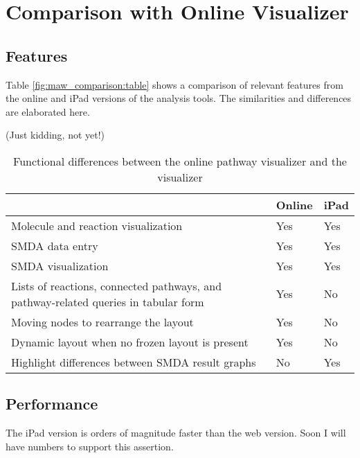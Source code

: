 \section{Comparison with Online \pathcasemaw Visualizer}
\label{sect:maw_comparison}

\subsection{Features}
\label{sect:maw_comparison_features}

Table \ref{fig:maw_comparison:table} shows a comparison of relevant features
from the online and iPad versions of the \pathcasemaw analysis tools. The
similarities and differences are elaborated here.

(Just kidding, not yet!)

\begin{table}[ht!]
\centering
\begin{tabular}{ | p{3in} | l | l | }
    \hline
                        & Online    & iPad \\ \hline

    Molecule and reaction visualization
                        & Yes       & Yes \\ \hline

    SMDA data entry     & Yes       & Yes \\ \hline

    SMDA visualization  & Yes       & Yes \\ \hline

    Lists of reactions, connected pathways, and pathway-related queries in
    tabular form
                        & Yes       & No \\ \hline

    Moving nodes to rearrange the layout
                        & Yes       & No \\ \hline

    Dynamic layout when no frozen layout is present
                        & Yes       & No \\ \hline

    Highlight differences between SMDA result graphs
                        & No        & Yes \\ \hline
\end{tabular}
    \label{fig:maw_comparison_table}
    \caption{Functional differences between the online \pathcasemaw pathway
    visualizer and the \mawapp visualizer}
\end{table}

\subsection{Performance}
\label{sect:maw_comparison_performance}

The iPad version is orders of magnitude faster than the web version. Soon I will
have numbers to support this assertion.
